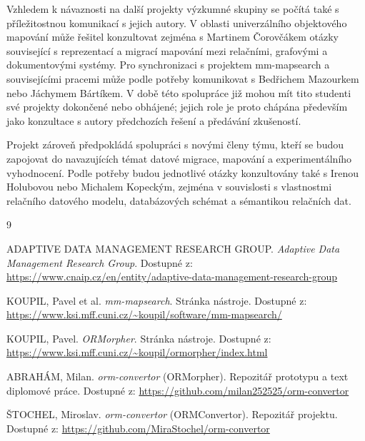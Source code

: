 \documentclass{article}
\begin{document}
Vzhledem k návaznosti na další projekty výzkumné skupiny se počítá také s příležitostnou komunikací s jejich autory. V oblasti univerzálního objektového mapování může řešitel konzultovat zejména s Martinem Čorovčákem otázky související s reprezentací a migrací mapování mezi relačními, grafovými a dokumentovými systémy. Pro synchronizaci s projektem mm-mapsearch a souvisejícími pracemi může podle potřeby komunikovat s Bedřichem Mazourkem nebo Jáchymem Bártíkem. V době této spolupráce již mohou mít tito studenti své projekty dokončené nebo obhájené; jejich role je proto chápána především jako konzultace s autory předchozích řešení a předávání zkušeností.

Projekt zároveň předpokládá spolupráci s novými členy týmu, kteří se budou zapojovat do navazujících témat datové migrace, mapování a experimentálního vyhodnocení. Podle potřeby budou jednotlivé otázky konzultovány také s Irenou Holubovou nebo Michalem Kopeckým, zejména v souvislosti s vlastnostmi relačního datového modelu, databázových schémat a sémantikou relačních dat.

\begin{thebibliography}{9}


ADAPTIVE DATA MANAGEMENT RESEARCH GROUP. \emph{Adaptive Data Management Research Group}. Dostupné z: \url{https://www.cnaip.cz/en/entity/adaptive-data-management-research-group}

KOUPIL, Pavel et al. \emph{mm-mapsearch}. Stránka nástroje. Dostupné z: \url{https://www.ksi.mff.cuni.cz/~koupil/software/mm-mapsearch/}

KOUPIL, Pavel. \emph{ORMorpher}. Stránka nástroje. Dostupné z: \url{https://www.ksi.mff.cuni.cz/~koupil/ormorpher/index.html}

ABRAHÁM, Milan. \emph{orm-convertor} (ORMorpher). Repozitář prototypu a text diplomové práce. Dostupné z: \url{https://github.com/milan252525/orm-convertor}

ŠTOCHEL, Miroslav. \emph{orm-convertor} (ORMConvertor). Repozitář projektu. Dostupné z: \url{https://github.com/MiraStochel/orm-convertor}

\end{thebibliography}
\end{document}
